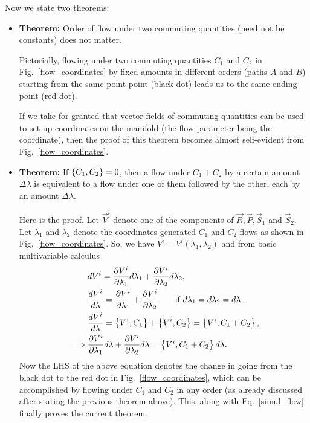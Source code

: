 Now we state two theorems:
\begin{itemize}
\item \textbf{Theorem:} Order of flow under two commuting quantities
(need not be constants) does not matter.


Pictorially, flowing under two commuting quantities $C_1$ and $C_2$ 
in Fig.~\ref{flow_coordinates}
by fixed amounts in different orders (paths $A$ and $B$) 
starting from the same point 
point (black dot) leads us to the same ending point (red dot).


If we take for granted that vector fields of commuting 
quantities can be used to
set up coordinates on the manifold (the flow parameter being the coordinate),
then the proof of this theorem
becomes almost self-evident from Fig.~\ref{flow_coordinates}.


\item \textbf{Theorem:} If $\left\lbrace C_1, C_2 \right\rbrace = 0$, then a flow under 
$C_1 + C_2$ by a certain amount $\Delta \lambda$ is equivalent 
to a flow under one of them followed by the other, each by an amount
$\Delta \lambda$.


Here is the proof. Let $\vec{V}^i$ denote one of the 
components of $\vec{R}, \vec{P}, \vec{S}_1$ and $\vec{S}_2$. Let
$\lambda_1$ and $\lambda_2$ denote the coordinates generated $C_1$
and $C_2$ flows as shown in Fig.~\ref{flow_coordinates}. So, we have
$V^i = V^i(\lambda_1, \lambda_2)$ and from basic multivariable
calculus
\begin{align}
& dV^i    = \frac{\partial V^i}{\partial \lambda_1} d \lambda_1 + \frac{\partial V^i}{\partial \lambda_2}   d \lambda_2   ,\\
&  \frac{dV^i}{d \lambda}    = \frac{\partial V^i}{\partial \lambda_1} + \frac{\partial V^i}{\partial \lambda_2}     \quad \quad  \text{if~}d\lambda_1 = d \lambda_2 = d \lambda  ,  \\
& \frac{dV^i}{d \lambda}   =  \left\lbrace V^i , C_1 \right\rbrace +  \left\lbrace V^i , C_2 \right\rbrace = \left\lbrace V^i , C_1 + C_2 \right\rbrace ,
\\
\implies  &  \frac{\partial V^i}{\partial \lambda_1} d \lambda + \frac{\partial V^i}{\partial \lambda_2}   d \lambda   =    \left\lbrace V^i , C_1 + C_2 \right\rbrace  d \lambda  .    \label{simul_flow}
\end{align}
Now the LHS of the above equation denotes the change in going from the
black dot to the red dot in Fig.~\ref{flow_coordinates},
which can be accomplished by flowing under $C_1$ and $C_2$ in any order 
(as already discussed after stating the previous theorem above).
This, along with Eq.~\eqref{simul_flow} finally proves the current theorem.
\end{itemize}




